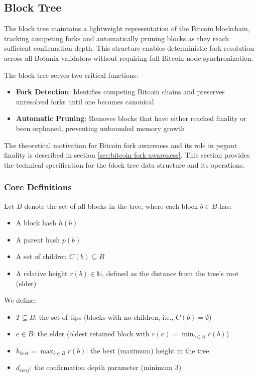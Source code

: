 \subsection{Block Tree}
\label{sec:block-tree}

The block tree maintains a lightweight representation of the Bitcoin blockchain, tracking competing forks and automatically pruning blocks as they reach sufficient confirmation depth. This structure enables deterministic fork resolution across all Botanix validators without requiring full Bitcoin node synchronization.

The block tree serves two critical functions:
\begin{itemize}
    \item \textbf{Fork Detection}: Identifies competing Bitcoin chains and preserves unresolved forks until one becomes canonical
    \item \textbf{Automatic Pruning}: Removes blocks that have either reached finality or been orphaned, preventing unbounded memory growth
\end{itemize}

The theoretical motivation for Bitcoin fork awareness and its role in pegout finality is described in section \ref{sec:bitcoin-fork-awareness}. This section provides the technical specification for the block tree data structure and its operations.

\subsubsection{Core Definitions}

Let $B$ denote the set of all blocks in the tree, where each block $b \in B$ has:
\begin{itemize}
    \item A block hash $h(b)$
    \item A parent hash $p(b)$
    \item A set of children $C(b) \subseteq B$
    \item A relative height $r(b) \in \mathbb{N}$, defined as the distance from the tree's root (elder)
\end{itemize}

We define:
\begin{itemize}
    \item $T \subseteq B$: the set of tips (blocks with no children, i.e., $C(b) = \emptyset$)
    \item $e \in B$: the elder (oldest retained block with $r(e) = \min_{b \in B} r(b)$)
    \item $h_{best} = \max_{b \in B} r(b)$: the best (maximum) height in the tree
    \item $d_{conf}$: the confirmation depth parameter (minimum 3)
\end{itemize}

